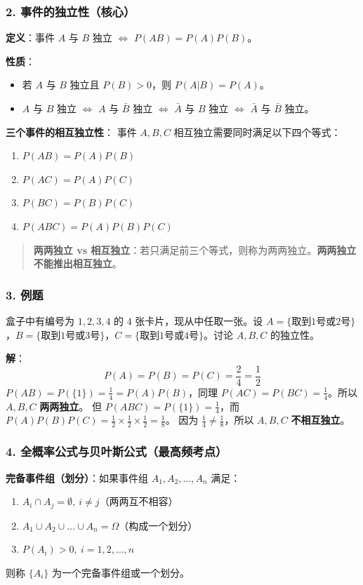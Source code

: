 \documentclass[12pt,a4paper]{ctexart}
\newenvironment{myquote}
  {\par\vspace{0.5em}\begin{quote}\sffamily\color{gray}}
  {\end{quote}\vspace{0.5em}}
\begin{document}
\subsubsection{2. 事件的独立性（核心）}
\textbf{定义}：事件 $A$ 与 $B$ 独立 $\iff$ $P(AB) = P(A)P(B)$。

\textbf{性质}：
\begin{itemize}[noitemsep]
    \item 若 $A$ 与 $B$ 独立且 $P(B) > 0$，则 $P(A|B) = P(A)$。
    \item $A$ 与 $B$ 独立 $\iff$ $A$ 与 $\bar{B}$ 独立 $\iff$ $\bar{A}$ 与 $B$ 独立 $\iff$ $\bar{A}$ 与 $\bar{B}$ 独立。
\end{itemize}

\textbf{三个事件的相互独立性}：
事件 $A, B, C$ 相互独立需要同时满足以下四个等式：
\begin{enumerate}[noitemsep]
    \item $P(AB) = P(A)P(B)$
    \item $P(AC) = P(A)P(C)$
    \item $P(BC) = P(B)P(C)$
    \item $P(ABC) = P(A)P(B)P(C)$
\end{enumerate}

\begin{myquote}
    \textbf{两两独立 vs 相互独立}：若只满足前三个等式，则称为两两独立。\textbf{两两独立不能推出相互独立}。
\end{myquote}

\subsubsection{3. 例题}
盒子中有编号为 $1,2,3,4$ 的 $4$ 张卡片，现从中任取一张。设 $A=\{取到1号或2号\}$，$B=\{取到1号或3号\}$，$C=\{取到1号或4号\}$。讨论 $A,B,C$ 的独立性。

\textbf{解}：
\[
    P(A) = P(B) = P(C) = \frac{2}{4} = \frac{1}{2}
\]
$P(AB) = P(\{1\}) = \frac{1}{4} = P(A)P(B)$，同理 $P(AC)=P(BC)=\frac{1}{4}$。所以 $A, B, C$ \textbf{两两独立}。
但 $P(ABC) = P(\{1\}) = \frac{1}{4}$，而 $P(A)P(B)P(C) = \frac{1}{2} \times \frac{1}{2} \times \frac{1}{2} = \frac{1}{8}$。
因为 $\frac{1}{4} \ne \frac{1}{8}$，所以 $A, B, C$ \textbf{不相互独立}。

\subsubsection{4. 全概率公式与贝叶斯公式（最高频考点）}

\textbf{完备事件组（划分）}：如果事件组 $A_1, A_2, \dots, A_n$ 满足：
\begin{enumerate}[noitemsep]
    \item $A_i \cap A_j = \emptyset,\ i \ne j$（两两互不相容）
    \item $A_1 \cup A_2 \cup \dots \cup A_n = \Omega$（构成一个划分）
    \item $P(A_i) > 0,\ i = 1,2,\dots,n$
\end{enumerate}
则称 $\{A_i\}$ 为一个完备事件组或一个划分。
\end{document}
